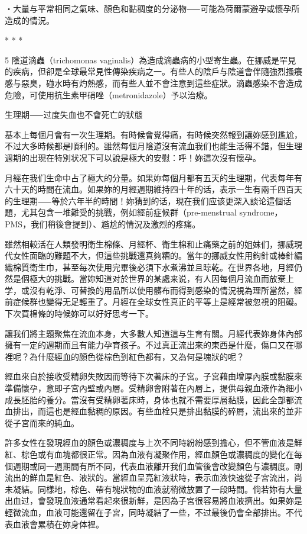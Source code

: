 \documentclass[12pt,UTF8]{ctexbook}
\begin{document}
‧大量与平常相同之氣味、顏色和黏稠度的分泌物⸺可能為荷爾蒙避孕或懷孕所造成的情況。





* * *



5	陰道滴蟲（trichomonas vaginalis）為造成滴蟲病的小型寄生蟲。在挪威是罕見的疾病，但卻是全球最常見性傳染疾病之一。有些人的陰戶与陰道會伴隨強烈搔癢感与惡臭，碰水時有灼熱感，而有些人並不會注意到這些症狀。滴蟲感染不會造成危險，可使用抗生素甲硝唑（metronidazole）予以治療。





生理期⸺过度失血也不會死亡的狀態




基本上每個月會有一次生理期。有時候會覺得痛，有時候突然報到讓妳感到尷尬，不过大多時候都是順利的。雖然每個月陰道沒有流血我们也能生活得不錯，但生理週期的出現在特別状况下可以說是極大的安慰：呼！妳這次沒有懷孕。

月經在我们生命中占了極大的分量。如果妳每個月都有五天的生理期，代表每年有六十天的時間在流血。如果妳的月經週期維持四十年的话，表示一生有兩千四百天的生理期⸺等於六年半的時間！妳猜到的话，現在我们应该更深入談论這個话題，尤其包含一堆難受的挑戰，例如經前症候群（pre-menstrual syndrome，PMS，我们稍後會提到）、尷尬的情況及激烈的疼痛。

雖然相較活在人類發明衛生棉條、月經杯、衛生棉和止痛藥之前的姐妹们，挪威現代女性面臨的難題不大，但這些挑戰還真夠糟的。當年的挪威女性用鉤針或棒針編織棉質衛生巾，甚至每次使用完畢後必須下水煮沸並且晾乾。在世界各地，月經仍然是個極大的挑戰。當妳知道对於世界的某處来说，有人因每個月流血而放棄上学，或沒有乾淨、可替換的用品所以使用髒布而得到感染的情況視為理所當然，經前症候群也變得无足輕重了。月經在全球女性真正的平等上是經常被忽視的阻礙。下次買棉條的時候妳可以好好思考一下。

讓我们將主題聚焦在流血本身，大多數人知道這与生育有關。月經代表妳身体內部擁有一定的週期而且有能力孕育孩子。不过真正流出來的東西是什麼，傷口又在哪裡呢？為什麼經血的顏色從棕色到紅色都有，又為何是塊狀的呢？

經血來自於接收受精卵失敗因而等待下次著床的子宮。子宮藉由增厚內膜或黏膜來準備懷孕，意即子宮內壁或內層。受精卵會附著在內層上，提供母親血液作為細小成長胚胎的養分。當沒有受精卵著床時，身体也就不需要厚層黏膜，因此全部都流血排出，而這也是經血黏稠的原因。有些血栓只是排出黏膜的碎屑，流出來的並非從子宮而來的純血。

許多女性在發現經血的顏色或濃稠度与上次不同時紛紛感到擔心，但不管血液是鮮紅、棕色或有血塊都很正常。因為血液有凝聚作用，經血顏色或濃稠度的變化在每個週期或同一週期間有所不同，代表血液離开我们血管後會改變顏色与濃稠度。剛流出的鮮血是紅色、液狀的。當經血呈亮紅液狀時，表示血液快速從子宮流出，尚未凝結。同樣地，棕色、帶有塊狀物的血液就稍微放置了一段時間。倘若妳有大量出血过，會發現血液通常看起來很新鮮，是因為子宮很容易將血液擠出。如果妳是輕微流血，血液可能還留在子宮，同時凝結了一些，不过最後仍會全部排出。不代表血液會累積在妳身体裡。
\end{document}
